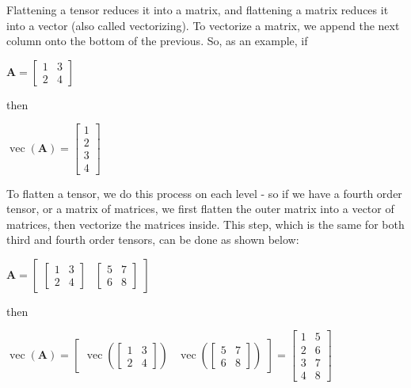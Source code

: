 \documentclass[twocolumn,10pt]{asme2ej}
\DeclareMathOperator{\vect}{vec}
\begin{document}
Flattening a tensor reduces it into a matrix, and flattening a matrix reduces it into a vector (also called vectorizing). To vectorize a matrix, we append the next column onto the bottom of the previous. So, as an example, if

\bigskip
\begin{center}
$\bm{A} = \begin{bmatrix} 1 & 3 \\ 2 & 4 \end{bmatrix}$
\end{center}

then

\begin{center}
$\vect (\bm{A}) = \begin{bmatrix} 1 \\ 2 \\ 3 \\ 4 \end{bmatrix}$
\end{center}

To flatten a tensor, we do this process on each level - so if we have a fourth order tensor, or a matrix of matrices, we first flatten the outer matrix into a vector of matrices, then vectorize the matrices inside. This step, which is the same for both third and fourth order tensors, can be done as shown below:

\bigskip
\begin{center}
$\bm{A} = \begin{bmatrix} \begin{bmatrix} 1 & 3 \\ 2 & 4 \end{bmatrix} & \begin{bmatrix} 5 & 7 \\ 6 & 8 \end{bmatrix} \end{bmatrix}$
\end{center}

then

\begin{center}
$\vect (\bm{A}) = \begin{bmatrix} \vect \left(\begin{bmatrix} 1 & 3 \\ 2 & 4 \end{bmatrix}\right) & \vect \left(\begin{bmatrix} 5 & 7 \\ 6 & 8 \end{bmatrix}\right) \end{bmatrix} = \begin{bmatrix} 1 & 5 \\ 2 & 6 \\ 3 & 7 \\ 4 & 8 \end{bmatrix}$
\end{center}
\end{document}
